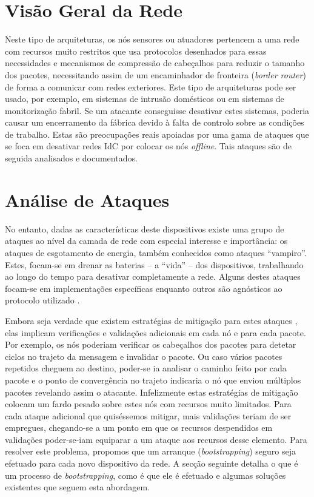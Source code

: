 \documentclass{llncs}
\begin{document}
\section{Visão Geral da Rede}
\label{sec:network_overview}


Neste tipo de arquiteturas, os nós sensores ou atuadores pertencem a uma rede com recursos muito restritos que usa protocolos desenhados para essas necessidades e mecanismos de compressão de cabeçalhos para reduzir o tamanho dos pacotes, necessitando assim de um encaminhador de fronteira (\textit{border router}) de forma a comunicar com redes exteriores. 
Este tipo de arquiteturas pode ser usado, por exemplo, em sistemas de intrusão domésticos ou em sistemas de monitorização fabril. 
Se um atacante conseguisse desativar estes sistemas, poderia causar um encerramento da fábrica devido à falta de controlo sobre as condições de trabalho. 
Estas são preocupações reais apoiadas por uma gama de ataques que se foca em desativar redes \ac{IdC} por colocar os nós \textit{offline}. 
Tais ataques são de seguida analisados e documentados.

\section{Análise de Ataques}
\label{sec:attack_analysis}
 
No entanto, dadas as características deste dispositivos existe uma grupo de ataques ao nível da camada de rede com especial interesse e importância: os ataques de esgotamento de energia, também conhecidos como ataques ``vampiro''.
Estes, focam-se em drenar as baterias -- a ``vida'' -- dos dispositivos, trabalhando ao longo do tempo para desativar completamente a rede.
Alguns destes ataques focam-se em implementações específicas enquanto outros são agnósticos ao protocolo utilizado \cite{Vasserman2013}\cite{Pongle2015}. 

Embora seja verdade que existem estratégias de mitigação para estes ataques \cite{Vasserman2013}, elas implicam verificações e validações adicionais em cada nó e para cada pacote. 
Por exemplo, os nós poderiam verificar os cabeçalhos dos pacotes para detetar ciclos no trajeto da mensagem e invalidar o pacote. 
Ou caso vários pacotes repetidos cheguem ao destino, poder-se ia analisar o caminho feito por cada pacote e o ponto de convergência no trajeto indicaria o nó que enviou múltiplos pacotes revelando assim o atacante. 
Infelizmente estas estratégias de mitigação colocam um fardo pesado sobre estes nós com recursos muito limitados. 
Para cada ataque adicional que quiséssemos mitigar, mais validações teriam de ser empregues, chegando-se a um ponto em que os recursos despendidos em validações poder-se-iam equiparar a um ataque aos recursos desse elemento. 
Para resolver este problema, propomos que um arranque (\textit{bootstrapping}) seguro seja efetuado para cada novo dispositivo da rede. 
A secção seguinte detalha o que é um processo de \textit{bootstrapping}, como é que ele é efetuado e algumas soluções existentes que seguem esta abordagem.
\end{document}
